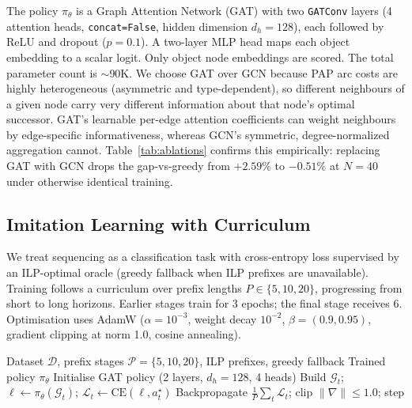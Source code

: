 \documentclass[review,times]{elsarticle}
\begin{document}
The policy $\pi_\theta$ is a Graph Attention Network (GAT) with two \texttt{GATConv} layers (4 attention heads, \texttt{concat=False}, hidden dimension $d_h{=}128$), each followed by ReLU and dropout ($p{=}0.1$). A two-layer MLP head maps each object embedding to a scalar logit. Only object node embeddings are scored. The total parameter count is ${\sim}$90K. We choose GAT over GCN because PAP arc costs are highly heterogeneous (asymmetric and type-dependent), so different neighbours of a given node carry very different information about that node's optimal successor. GAT's learnable per-edge attention coefficients can weight neighbours by edge-specific informativeness, whereas GCN's symmetric, degree-normalized aggregation cannot. Table~\ref{tab:ablations} confirms this empirically: replacing GAT with GCN drops the gap-vs-greedy from $+2.59\%$ to $-0.51\%$ at $N{=}40$ under otherwise identical training.

\subsection{Imitation Learning with Curriculum}

We treat sequencing as a classification task with cross-entropy loss supervised by an ILP-optimal oracle (greedy fallback when ILP prefixes are unavailable). Training follows a curriculum over prefix lengths $P \in \{5, 10, 20\}$, progressing from short to long horizons. Earlier stages train for 3 epochs; the final stage receives 6. Optimisation uses AdamW \cite{loshchilov2019adamw} ($\alpha{=}10^{-3}$, weight decay $10^{-2}$, $\beta{=}(0.9, 0.95)$, gradient clipping at norm 1.0, cosine annealing).

\begin{algorithm}[htbp]
\caption{Curriculum-Based Imitation Learning}
\label{alg:training}
\begin{algorithmic}[1]
\REQUIRE Dataset $\mathcal{D}$, prefix stages $\mathcal{P}{=}\{5,10,20\}$, ILP prefixes, greedy fallback
\ENSURE Trained policy $\pi_\theta$
\STATE Initialise GAT policy (2 layers, $d_h{=}128$, 4 heads)
                \STATE Build $\mathcal{G}_t$; $\ell \leftarrow \pi_\theta(\mathcal{G}_t)$; $\mathcal{L}_t \leftarrow \text{CE}(\ell, a_t^\star)$
            \ENDFOR
            \STATE Backpropagate $\frac{1}{P}\sum_t \mathcal{L}_t$; clip $\|\nabla\|{\le}1.0$; step
        \ENDFOR
    \ENDFOR
\ENDFOR
\end{algorithmic}
\end{algorithm}
\end{document}
